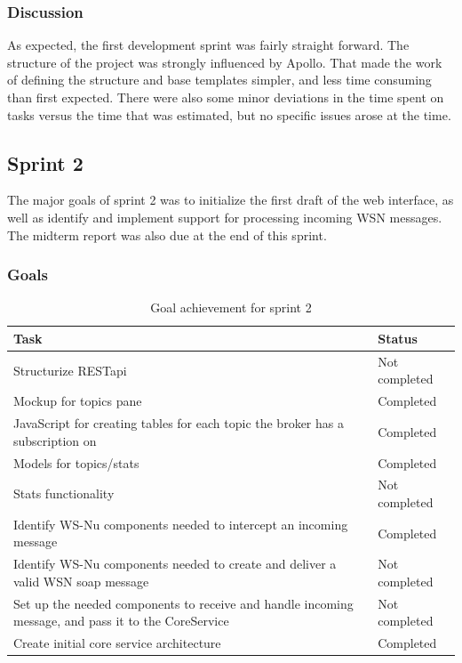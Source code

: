 \subsubsection{Discussion}
\label{subsec:project_lifecycle-development-sprint_1-discussion}

As expected, the first development sprint was fairly straight forward. The structure of the project was strongly influenced by Apollo. That made the work of defining the structure and base templates simpler, and less time consuming than first expected. There were also some minor deviations in the time spent on tasks versus the time that was estimated, but no specific issues arose at the time.

\subsection{Sprint 2}
\label{subsec:project_lifecycle-development-sprint_2}

The major goals of sprint 2 was to initialize the first draft of the web interface, as well as identify and implement support for processing incoming WSN messages. The midterm report was also due at the end of this sprint.

\subsubsection{Goals}
\label{subsec:project_lifecycle-development-sprint_2-goals}

\begin{table}[ht!]
\small
\centering
\begin{tabular}{ | p{10cm} | p{2cm} |}
\hline
\rowcolor{lightgray}
 \textbf{Task} & \textbf{Status} \\
\hline
\rowcolor{orange!40}
Structurize RESTapi & Not completed \\
\rowcolor{green!30}
Mockup for topics pane & Completed \\
\rowcolor{green!30}
JavaScript for creating tables for each topic the broker has a subscription on & Completed \\
\rowcolor{green!30}
Models for topics/stats & Completed \\
\rowcolor{orange!40}
Stats functionality	& Not completed \\
\rowcolor{green!30}
Identify WS-Nu components needed to intercept an incoming message & Completed \\
\rowcolor{orange!40}
Identify WS-Nu components needed to create and deliver a valid WSN soap message & Not completed \\
\rowcolor{orange!40}
Set up the needed components to receive and handle incoming message, and pass it to the CoreService	& Not completed \\
\rowcolor{green!30}
Create initial core service architecture & Completed \\
\hline
\end{tabular}
\caption{Goal achievement for sprint 2}
\label{tab:sprint 2, goals}
\end{table}


